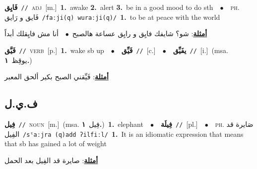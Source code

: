 \documentclass[10pt,a4paper,twoside]{article} %
\begin{document}
\begin{multicols}{2}
{\setlength\topsep{0pt}\textbf{\foreignlanguage{arabic}{فَايِق}}\ {\color{gray}\texttt{//}\color{black}}\ \textsc{adj}\ [m.]\ \textbf{1.}~awake  \textbf{2.}~alert  \textbf{3.}~be in a good mood to do sth\ \ $\bullet$\ \ \textsc{ph.} \color{gray} \foreignlanguage{arabic}{فَايق و رَايق}\color{black}\ {\color{gray}\texttt{/{\sffamily faːji(q) wuraːji(q)}/}\color{black}}\ \textbf{1.}~to be at peace with the world\  \begin{flushright}\color{gray}\foreignlanguage{arabic}{\textbf{\underline{\foreignlanguage{arabic}{أمثلة}}}: شو؟ شايفك فايِق و رايِق عساعة هالصبح\ $\bullet$\ \  أنا مش فايِقلك أبداً}\end{flushright}\color{black}} \vspace{2mm}

{\setlength\topsep{0pt}\textbf{\foreignlanguage{arabic}{فَيَّق}}\ {\color{gray}\texttt{//}\color{black}}\ \textsc{verb}\ [p.]\ \textbf{1.}~wake sb up\ \ $\bullet$\ \ \setlength\topsep{0pt}\textbf{\foreignlanguage{arabic}{فَيِّق}}\ {\color{gray}\texttt{//}\color{black}}\ [c.]\ \ $\bullet$\ \ \setlength\topsep{0pt}\textbf{\foreignlanguage{arabic}{يفَيِّق}}\ {\color{gray}\texttt{//}\color{black}}\ [i.]\ \color{gray}(msa. \foreignlanguage{arabic}{يوقِظ}~\foreignlanguage{arabic}{\textbf{١.}})\color{black}\  \begin{flushright}\color{gray}\foreignlanguage{arabic}{\textbf{\underline{\foreignlanguage{arabic}{أمثلة}}}: فَيِّقني الصبح بكير ألحق المعبر}\end{flushright}\color{black}} \vspace{2mm}

\vspace{-3mm}
\subsection*{\color{blue}\foreignlanguage{arabic}{ف.ي.ل}\color{blue}{}} 

{\setlength\topsep{0pt}\textbf{\foreignlanguage{arabic}{فِيل}}\ {\color{gray}\texttt{//}\color{black}}\ \textsc{noun}\ [m.]\ \color{gray}(msa. \foreignlanguage{arabic}{فِيل}~\foreignlanguage{arabic}{\textbf{١.}})\color{black}\ \textbf{1.}~elephant\ \ $\bullet$\ \ \setlength\topsep{0pt}\textbf{\foreignlanguage{arabic}{فِيلَة}}\ {\color{gray}\texttt{//}\color{black}}\ [pl.]\ \ $\bullet$\ \ \textsc{ph.} \color{gray} \foreignlanguage{arabic}{صَايرة قد الفِيل}\color{black}\ {\color{gray}\texttt{/{\sffamily sˤaːjra (q)add ʔilfiːl}/}\color{black}}\ \textbf{1.}~It is an idiomatic expression that means that sb has gained a lot of weight\  \begin{flushright}\color{gray}\foreignlanguage{arabic}{\textbf{\underline{\foreignlanguage{arabic}{أمثلة}}}: صايرة قد الفِيل بعد الحمل}\end{flushright}\color{black}} \vspace{2mm}


\end{multicols}
\end{document}
